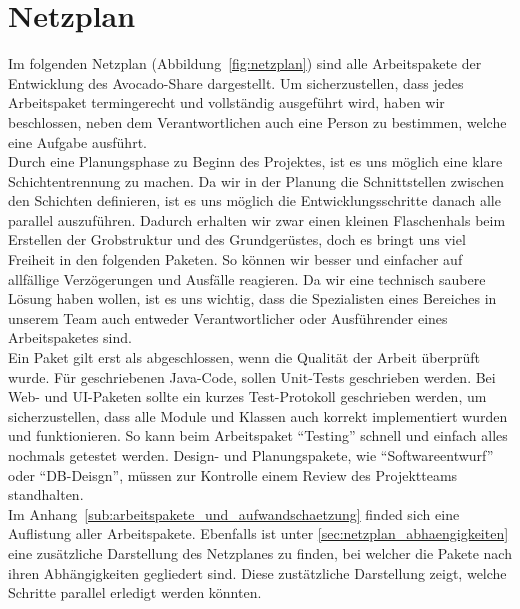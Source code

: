 \section{Netzplan}
Im folgenden Netzplan (Abbildung~\ref{fig:netzplan}) sind alle Arbeitspakete der Entwicklung des Avocado-Share dargestellt. 
Um sicherzustellen, dass jedes Arbeitspaket termingerecht und vollständig ausgeführt wird, haben wir beschlossen, neben dem Verantwortlichen auch eine Person zu bestimmen, welche eine Aufgabe ausführt.\\

Durch eine Planungsphase zu Beginn des Projektes, ist es uns möglich eine klare Schichtentrennung zu machen.
Da wir in der Planung die Schnittstellen zwischen den Schichten definieren, ist es uns möglich die Entwicklungsschritte danach
alle parallel auszuführen. Dadurch erhalten wir zwar einen kleinen Flaschenhals beim Erstellen der Grobstruktur und des
Grundgerüstes, doch es bringt uns viel Freiheit in den folgenden Paketen. So können wir besser und einfacher auf allfällige
Verzögerungen und Ausfälle reagieren.
Da wir eine technisch saubere Lösung haben wollen, ist es uns wichtig, dass die Spezialisten eines Bereiches in unserem Team auch entweder Verantwortlicher oder Ausführender eines Arbeitspaketes sind. \\

Ein Paket gilt erst als abgeschlossen, wenn die Qualität der Arbeit überprüft wurde.
Für geschriebenen Java-Code, sollen Unit-Tests geschrieben werden. Bei Web- und UI-Paketen sollte ein kurzes Test-Protokoll geschrieben werden, um sicherzustellen, dass alle Module und Klassen auch korrekt implementiert wurden und funktionieren.
So kann beim Arbeitspaket "`Testing"' schnell und einfach alles nochmals getestet werden. Design- und Planungspakete, wie "`Softwareentwurf"' oder "`DB-Deisgn"', müssen zur Kontrolle einem Review des Projektteams standhalten.\\

Im Anhang~\ref{sub:arbeitspakete_und_aufwandschaetzung} finded sich eine Auflistung aller Arbeitspakete. Ebenfalls ist unter \ref{sec:netzplan_abhaengigkeiten} eine zusätzliche Darstellung des Netzplanes zu finden, bei welcher die Pakete nach ihren Abhängigkeiten gegliedert sind. Diese zustätzliche Darstellung zeigt, welche Schritte parallel erledigt werden könnten.

